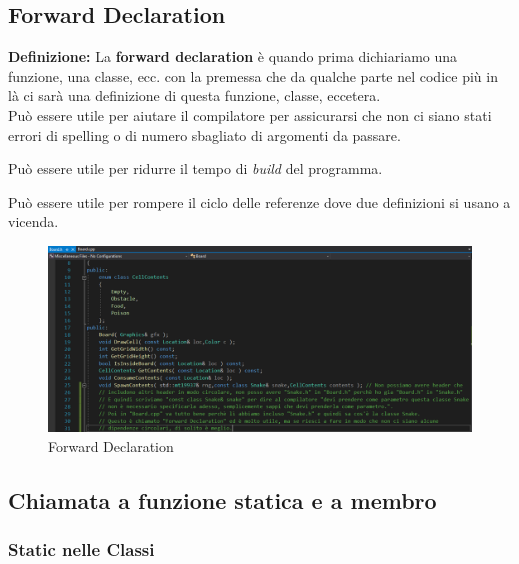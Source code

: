 \subsection{Forward Declaration}

\textsf{\small \textbf{Definizione: } La \textbf{forward declaration} è quando prima dichiariamo una funzione, una classe, ecc. con la premessa che da qualche parte nel codice più in là ci sarà una definizione di questa funzione, classe, eccetera.} \\

\textsf{\small Può essere utile per aiutare il compilatore per assicurarsi che non ci siano stati errori di spelling o di numero sbagliato di argomenti da passare.} 

\textsf{\small Può essere utile per ridurre il tempo di \emph{build} del programma.}

\textsf{\small Può essere utile per rompere il ciclo delle referenze dove due definizioni si usano a vicenda.} \\

\begin{figure}[H]
	\centering
	\includegraphics[width=1\textwidth, height=1\textheight, keepaspectratio]{./imgs/Forward_declaration.png}
	\caption{Forward Declaration}
	\label{fig:forward_declaration}
\end{figure}


\subsection{Chiamata a funzione statica e a membro} 

\subsubsection{Static nelle Classi}

